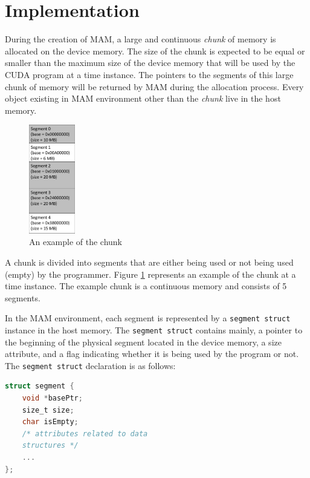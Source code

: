 \documentclass[conference]{IEEEtran}
\def\code#1{\texttt{#1}}
\begin{document}
\section{Implementation}
During the creation of MAM, a large and continuous \emph{chunk} of memory is allocated on the device memory. The size of the chunk is expected to be equal or smaller than the maximum size of the device memory that will be used by the CUDA program at a time instance. The pointers to the segments of this large chunk of memory will be returned by MAM during the allocation process. Every object existing in MAM environment other than the \emph{chunk} live in the host memory.


\begin{figure}[h]%
\centering
  \includegraphics[width=0.18\textwidth]{random-chunk/random-chunk-pointers-and-sizes.png}
  \caption{An example of the chunk}
  \label{fig:chunk}
\end{figure}



A chunk is divided into segments that are either being used or not being used (empty) by the programmer. Figure \ref{fig:chunk} represents an example of the chunk at a time instance. The example chunk is a continuous memory and consists of 5 segments. 

In the MAM environment, each segment is represented by a \code{segment struct} instance in the host memory. The \code{segment struct} contains mainly, a pointer to the beginning of the physical segment located in the device memory, a size attribute, and a flag indicating whether it is being used by the program or not. The \code{segment struct} declaration is as follows:\\

\begin{lstlisting}[language=C]
struct segment {
	void *basePtr;
	size_t size;
	char isEmpty;
	/* attributes related to data 
	structures */
	...
};
\end{lstlisting}
\end{document}
